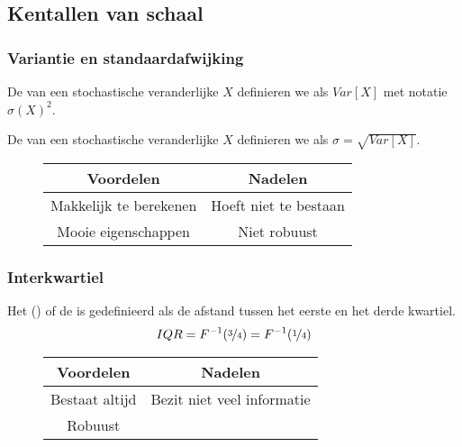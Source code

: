 \documentclass[main.tex]{subfiles}
\begin{document}
\subsection{Kentallen van schaal}
\label{sec:kentallen-van-schaal}

\subsubsection{Variantie en standaardafwijking}
\label{sec:vari-en-stand}

\begin{de}
  De  van een stochastische veranderlijke $X$ definieren we als $Var[X]$ met notatie $\sigma(X)^{2}$.
\end{de}

\begin{de}
  De  van een stochastische veranderlijke $X$ definieren we als $\sigma = \sqrt{Var[X]}$.
\end{de}

\begin{figure}[H]
  \centering
  \begin{tabular}{|c|c|}
    \hline
    Voordelen & Nadelen\\
    \hline \hline
    Makkelijk te berekenen & Hoeft niet te bestaan\\
    Mooie eigenschappen & Niet robuust\\
    \hline
  \end{tabular}
\end{figure}

\subsubsection{Interkwartiel}
\label{sec:interkwartiel}

\begin{de}
  Het  () of de  is gedefinieerd als de afstand tussen het eerste en het derde kwartiel.
  \[ IQR = F^{-1}(\nicefrac{3}{4}) = F^{-1}(\nicefrac{1}{4}) \]
\end{de}

\begin{figure}[H]
  \centering
  \begin{tabular}{|c|c|}
    \hline
    Voordelen & Nadelen\\
    \hline \hline
    Bestaat altijd & Bezit niet veel informatie\\
    Robuust & \\
    \hline
  \end{tabular}
\end{figure}
\end{document}
